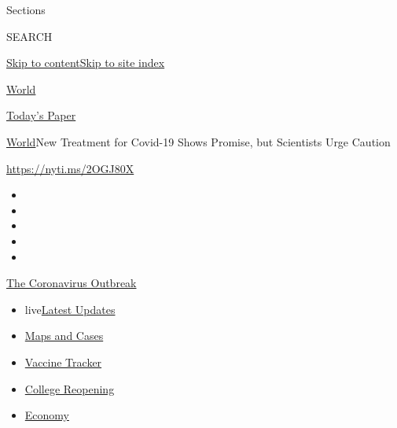 Sections

SEARCH

\protect\hyperlink{site-content}{Skip to
content}\protect\hyperlink{site-index}{Skip to site index}

\href{https://www.nytimes.com/section/world}{World}

\href{https://myaccount.nytimes.com/auth/login?response_type=cookie\&client_id=vi}{}

\href{https://www.nytimes.com/section/todayspaper}{Today's Paper}

\href{/section/world}{World}\textbar{}New Treatment for Covid-19 Shows
Promise, but Scientists Urge Caution

\url{https://nyti.ms/2OGJ80X}

\begin{itemize}
\item
\item
\item
\item
\item
\end{itemize}

\href{https://www.nytimes.com/news-event/coronavirus?action=click\&pgtype=Article\&state=default\&region=TOP_BANNER\&context=storylines_menu}{The
Coronavirus Outbreak}

\begin{itemize}
\tightlist
\item
  live\href{https://www.nytimes.com/2020/08/04/world/coronavirus-cases.html?action=click\&pgtype=Article\&state=default\&region=TOP_BANNER\&context=storylines_menu}{Latest
  Updates}
\item
  \href{https://www.nytimes.com/interactive/2020/us/coronavirus-us-cases.html?action=click\&pgtype=Article\&state=default\&region=TOP_BANNER\&context=storylines_menu}{Maps
  and Cases}
\item
  \href{https://www.nytimes.com/interactive/2020/science/coronavirus-vaccine-tracker.html?action=click\&pgtype=Article\&state=default\&region=TOP_BANNER\&context=storylines_menu}{Vaccine
  Tracker}
\item
  \href{https://www.nytimes.com/2020/08/02/us/covid-college-reopening.html?action=click\&pgtype=Article\&state=default\&region=TOP_BANNER\&context=storylines_menu}{College
  Reopening}
\item
  \href{https://www.nytimes.com/live/2020/08/04/business/stock-market-today-coronavirus?action=click\&pgtype=Article\&state=default\&region=TOP_BANNER\&context=storylines_menu}{Economy}
\end{itemize}

